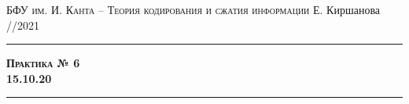 \documentclass[11pt]{exam}
\theoremstyle{definition}
\begin{document}
	{\noindent
		\textsc{БФУ им. И. Канта -- Теория кодирования и сжатия информации}
		\hfill {Е. Киршанова //2021\\}
	\hrule
	\begin{center}
		{\Large\textbf{
				\textsc{Практика № 6} \\[5pt] {15.10.20}
		} } 
	\end{center}
	\hrule \vspace{5mm}
	
	\thispagestyle{empty}
	
	\vspace{0.2cm}
	

	
%
%
%				
%				
	
}
\end{document}
